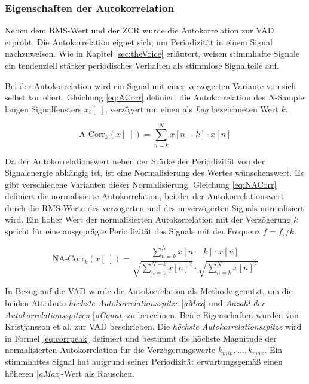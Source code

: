 \subsubsection{Eigenschaften der Autokorrelation}

Neben dem RMS-Wert und der ZCR wurde die Autokorrelation zur VAD erprobt. Die Autokorrelation eignet sich, um Periodizität in einem Signal nachzuweisen. Wie in Kapitel \ref{sec:theVoice} erläutert, weisen stimmhafte Signale ein tendenziell stärker periodisches Verhalten als stimmlose Signalteile auf. 

Bei der Autokorrelation wird ein Signal mit einer verzögerten Variante von sich selbst korreliert. Gleichung \ref{eq:ACorr} definiert die Autokorrelation des $N$-Sample langen Signalfensters $x_i[\;]$, verzögert um einen als \emph{Lag} bezeichneten Wert $k$.

\begin{equation}
\text{A-Corr}_k(x[\;]) = \sum_{n=k}^{N} x[n-k] \cdot x[n]
\label{eq:ACorr}
\end{equation}

Da der Autokorrelationswert neben der Stärke der Periodizität von der Signalenergie abhängig ist, ist eine Normalisierung des Wertes wünschenswert. Es gibt verschiedene Varianten dieser Normalisierung. Gleichung \ref{eq:NACorr} definiert die \glqq normalisierte Autokorrelation\grqq{}, bei der der Autokorrelationswert durch die RMS-Werte des verzögerten und des unverzögerten Signals normalisiert wird. Ein hoher Wert der normalisierten Autokorrelation mit der Verzögerung $k$ spricht für eine ausgeprägte Periodizität des Signals mit der Frequenz $f =  f_s / k $.\cite{vad_Lisboa}

\begin{equation}
\text{NA-Corr}_k(x[\;]) = \frac{\sum_{n=k}^{N} x[n-k] \cdot x[n]}{ \sqrt{\sum_{n=1}^{N-k}  x[n]^2}  \cdot  \sqrt{\sum_{n=k}^{N}  x[n]^2} }
\label{eq:NACorr}
\end{equation}



In Bezug auf die VAD wurde die Autokorrelation als Methode genutzt, um die beiden Attribute \emph{höchste Autokorrelationsspitze} [\emph{aMax}] und \emph{Anzahl der Autokorrelationsspitzen} [\emph{aCount}] zu berechnen. Beide Eigenschaften wurden von Kristjansson et al. \cite[S. 1 - 2]{vad_Lisboa} zur VAD beschrieben. Die \emph{höchste Autokorrelationsspitze} wird in Formel \ref{eq:corrpeak} definiert und bestimmt die höchste Magnitude der normalisierten Autokorrelation für die Verzögerungswerte $k_{min} , \ldots , k_{max}$. Ein stimmhaftes Signal hat aufgrund seiner Periodizität erwartungsgemäß einen höheren [\emph{aMax}]-Wert als Rauschen.

